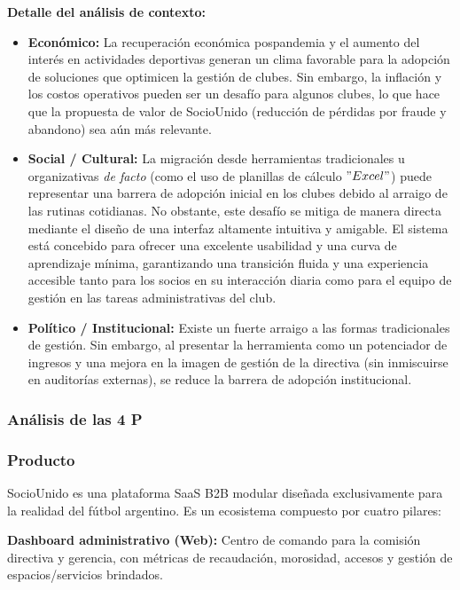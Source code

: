\vspace{0.3cm}

\textbf{Detalle del análisis de contexto:}

\begin{itemize}
    \item \textbf{Económico:} La recuperación económica pospandemia y el aumento del interés en actividades deportivas generan un clima favorable para la adopción de soluciones que optimicen la gestión de clubes. Sin embargo, la inflación y los costos operativos pueden ser un desafío para algunos clubes, lo que hace que la propuesta de valor de SocioUnido (reducción de pérdidas por fraude y abandono) sea aún más relevante.
    \item \textbf{Social / Cultural:} La migración desde herramientas tradicionales u organizativas \textit{de facto} (como el uso de planillas de cálculo $"Excel"$) puede representar una barrera de adopción inicial en los clubes debido al arraigo de las rutinas cotidianas. No obstante, este desafío se mitiga de manera directa mediante el diseño de una interfaz altamente intuitiva y amigable. El sistema está concebido para ofrecer una excelente usabilidad y una curva de aprendizaje mínima, garantizando una transición fluida y una experiencia accesible tanto para los socios en su interacción diaria como para el equipo de gestión en las tareas administrativas del club.
    \item \textbf{Político / Institucional:} Existe un fuerte arraigo a las formas tradicionales de gestión. Sin embargo, al presentar la herramienta como un potenciador de ingresos y una mejora en la imagen de gestión de la directiva (sin inmiscuirse en auditorías externas), se reduce la barrera de adopción institucional.
\end{itemize}

\newpage

\subsubsection{Análisis de las 4 P}

\subsubsection*{Producto}

SocioUnido es una plataforma SaaS B2B modular diseñada exclusivamente para la realidad del fútbol argentino. Es un ecosistema compuesto por cuatro pilares:

\textbf{Dashboard administrativo (Web):} Centro de comando para la comisión directiva y gerencia, con métricas de recaudación, morosidad, accesos y gestión de espacios/servicios brindados.

